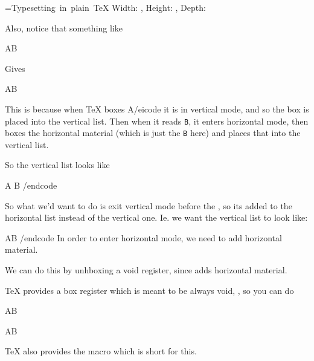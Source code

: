 {{    \textbox{}
        =\hbox{Typesetting in plain \TeX}
        Width: \the{}, Height: \the{}, Depth: \the{}
    \endtextbox

    \textbox\empty{1cm}{\lastey+.5cm}{\hsize-2cm}{}
        Also, notice that something like

\beginhi
\hbox{A}B
\endhi

        Gives
    \endtextbox

    \textbox{}
        \hbox{A}B
    \endtextbox

    \textbox\empty{1cm}{\lastey+5pt}{\hsize-2cm}{}
        This is because when \TeX{} boxes \icode \hbox{A}/eicode{} it is in vertical mode, and so the box is placed into the
        vertical list.
        Then when it reads {\tt B}, it enters horizontal mode, then boxes the horizontal material (which is just the {\tt B} here)
        and places that into the vertical list.
    \endtextbox

\endslide

\beginslide
    \bheadline

    \textbox\empty{1cm}{1cm}{\hsize-2cm}{}
        So the vertical list looks like

\begincode
\vbox{
    \hbox{A}
    \hbox{B}
}
/endcode

        So what we'd want to do is exit vertical mode before the \macroname\hbox, so its added to the horizontal list instead
        of the vertical one.
        Ie. we want the vertical list to look like:

\begincode
\vbox{
    \hbox{\hbox{A}B}
}
/endcode
        In order to enter horizontal mode, we need to add horizontal material.

        We can do this by unhboxing a void register, since \macroname\unhbox{} adds horizontal material.

        \TeX{} provides a box register which is meant to be always void, \macroname\voidb@x, so you can do

\beginhi
\unhbox\voidb@x\hbox{A}B
\endhi
    \endtextbox

    \textbox{}
        \unhbox\voidb@x\hbox{A}B
    \endtextbox

    \textbox\empty{1cm}{\lastey+5pt}{\hsize-2cm}{}
        \TeX{} also provides the macro \macroname\leavevmode{} which is short for this.

}}
